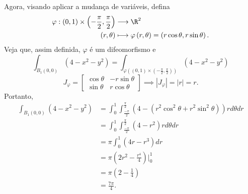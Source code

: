 \documentclass[a4paper]{report}
\begin{document}
Agora, visando aplicar a mudança de variáveis, defina
\begin{align*}
    \varphi : \left( 0,1 \right) \times \left( -\frac{\pi}{2},\frac{\pi}{2} \right)  &\longrightarrow \R^{2} \\
    \left( r,\theta \right)  &\longmapsto \varphi \left( r,\theta \right)  = \left( r\cos\theta, r\sin\theta \right) 
.\end{align*}
Veja que, assim definida, $\varphi $ é um difeomorfismo e \[
\int_{B_1\left( 0,0 \right) } \left( 4-x^2-y^2 \right) = \int_{\varphi \left( \left( 0,1 \right) \times \left( -\frac{\pi}{2}, \frac{\pi}{2} \right)  \right) } \left( 4-x^2-y^2 \right)
\] \[
    J_{\varphi } = \begin{bmatrix} \cos\theta & -r\sin\theta \\ \sin\theta & r\cos\theta \end{bmatrix} \implies \left| J_{\varphi } \right| = \left| r \right| = r
.\] Portanto,
\begin{align*}
    \int_{B_1\left( 0,0 \right) } \left( 4-x^2-y^2 \right) &= \int_0^{1} \int_{\frac{-\pi}{2}}^{\frac{\pi}{2}}  \left( 4-\left( r^2 \cos^2\theta + r^2\sin^2\theta \right)  \right) r d\theta dr \\
    &= \int_0^{1} \int_{\frac{-\pi}{2}}^{\frac{\pi}{2}} \left( 4 - r^2 \right) r d\theta dr \\
    &= \pi \int_0^{1}\left( 4r - r^3 \right) dr  \\
    &= \pi \left( 2r^2 - \frac{r^{4}}{4} \right)\Big|_0^{1} \\
    &=  \pi\left( 2 - \frac{1}{4} \right) \\
    &= \frac{7\pi}{4} 
.\end{align*}

\end{document}
